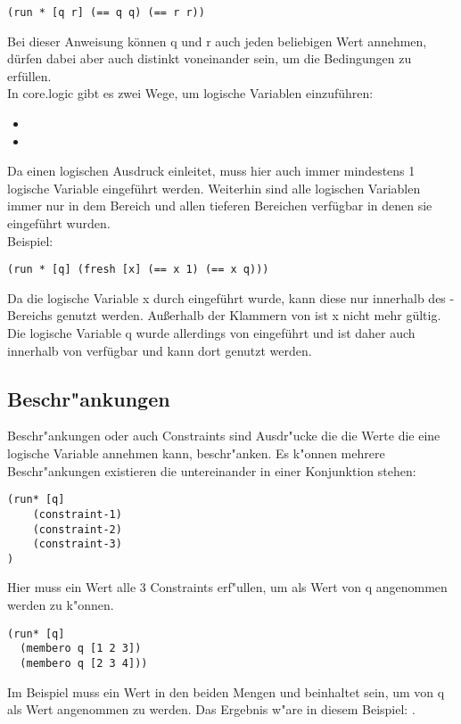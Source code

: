 \begin{lstlisting}
(run * [q r] (== q q) (== r r))
\end{lstlisting}
\begin{flushleft}
\end{flushleft}
Bei dieser Anweisung können q und r auch jeden beliebigen Wert annehmen, dürfen dabei aber auch distinkt voneinander sein, um die Bedingungen zu erfüllen.\\


In core.logic gibt es zwei Wege, um logische Variablen einzuführen:
\begin{itemize}
\item {}
\item {}
\end{itemize}

Da  einen logischen Ausdruck einleitet, muss hier auch immer mindestens 1 logische Variable eingeführt werden. Weiterhin sind alle logischen Variablen immer nur in dem Bereich und allen tieferen Bereichen verfügbar in denen sie eingeführt wurden.\\
Beispiel:
\begin{lstlisting}
(run * [q] (fresh [x] (== x 1) (== x q)))
\end{lstlisting}
Da die logische Variable x durch  eingeführt wurde, kann diese nur innerhalb des -Bereichs genutzt werden. Außerhalb der Klammern von  ist x nicht mehr gültig. Die logische Variable q wurde allerdings von   eingeführt und ist daher auch innerhalb von  verfügbar und kann dort genutzt werden.


\subsection{Beschr"ankungen}

Beschr"ankungen oder auch Constraints sind Ausdr"ucke die die Werte die eine logische Variable annehmen kann, beschr"anken. Es k"onnen mehrere Beschr"ankungen existieren die untereinander in einer Konjunktion stehen:
\begin{lstlisting}
(run* [q]
    (constraint-1)
    (constraint-2)
    (constraint-3)
)
\end{lstlisting}

Hier muss ein Wert alle 3 Constraints erf"ullen, um als Wert von q angenommen werden zu k"onnen.
\begin{lstlisting}
(run* [q]
  (membero q [1 2 3])
  (membero q [2 3 4]))
\end{lstlisting}

Im Beispiel muss ein Wert in den beiden Mengen \code{[1 2 3]} und \code{[2 3 4]} beinhaltet sein, um von q als Wert angenommen zu werden. Das Ergebnis w"are in diesem Beispiel: \code{[2 3]}.

